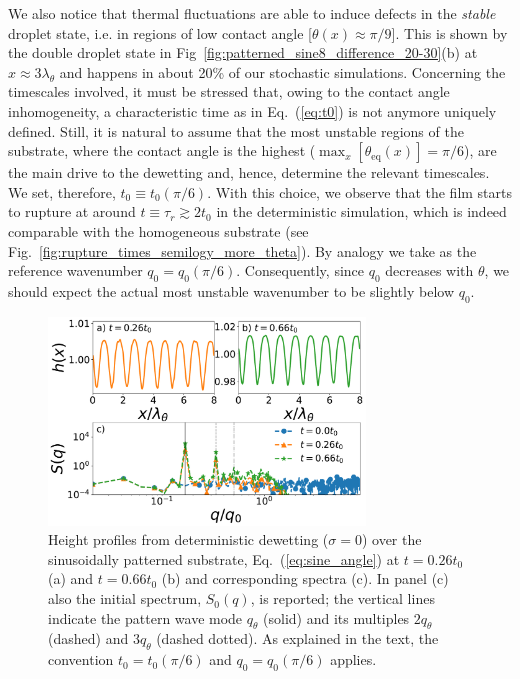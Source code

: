 We also notice that thermal fluctuations are able to induce defects in the \textit{stable} droplet state, i.e. in regions of low contact angle [$\theta(x) \approx \pi/9$]. 
This is shown by the double droplet state in Fig~\ref{fig:patterned_sine8_difference_20-30}(b) at $x \approx 3 \lambda_{\theta}$ and happens in about 20\% of our stochastic simulations.
Concerning the timescales involved, it must be stressed that, owing to the contact angle inhomogeneity, a characteristic time as in Eq.~(\ref{eq:t0}) is not anymore uniquely defined. 
Still, it is natural to assume that the most unstable regions of the substrate, where the contact angle is the highest ($\max_x[\theta_{\text{eq}}(x)] = \pi/6$), are the main drive to the dewetting and, hence, determine the relevant timescales. 
We set, therefore, $t_0 \equiv t_0(\pi/6)$. 
With this choice, we observe that the film starts to rupture at around $t \equiv \tau_r \gtrsim 2 t_0$ in the deterministic simulation, which is indeed comparable with the homogeneous substrate (see Fig.~\ref{fig:rupture_times_semilogy_more_theta}). 
By analogy we take as the reference wavenumber $q_0 = q_0(\pi/6)$. 
Consequently, since $q_0$ decreases with $\theta$, we should expect the actual most unstable wavenumber to be slightly below $q_0$.
\begin{figure}
    \centering
    \includegraphics[width=0.75\textwidth]{graphics/psd_spacedepCA_sine_25_10_00_[0, 450000, 1150000]_9_3_rescaled.pdf}
    \caption{Height profiles from deterministic dewetting ($\sigma=0$) over the sinusoidally patterned substrate, Eq.~(\ref{eq:sine_angle}) at $t=0.26 t_0$ (a) and $t=0.66 t_0$ (b) and corresponding spectra (c).  
    In panel (c) also the initial spectrum, $S_0(q)$, is reported; the vertical lines indicate the pattern wave mode $q_{\theta}$ (solid) and its multiples $2q_{\theta}$ (dashed) and $3q_{\theta}$ (dashed dotted).
    As explained in the text, the convention $t_0 = t_0(\pi/6)$ and $q_0 = q_0(\pi/6)$ applies.}   
    \label{fig:spectral_analysis_deter_sine8}
\end{figure}
